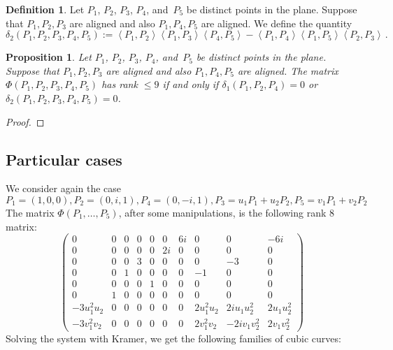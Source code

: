 \documentclass[12pt, a4paper, reqno, captions=tableheading,bibliography=totoc]{scrartcl}
\theoremstyle{plain}
\newtheorem{prop}[lemma]{Proposition}
\theoremstyle{definition}
\newtheorem{definition}[lemma]{Definition}
\newcommand{\imunit}{i}
\newcommand{\scl}[2]{\left\langle {#1}, {#2} \right\rangle}
\begin{document}
\begin{definition}
 Let $P_1$, $P_2$, $P_3$, $P_4$, and~$P_5$ be distinct points in the plane.
 Suppose that $P_1, P_2, P_3$ are aligned and also $P_1, P_4, P_5$ are aligned.
 We define the quantity
 \[
  \delta_2(P_1, P_2, P_3, P_4, P_5) :=
  \scl{P_1}{P_2} \scl{P_1}{P_3} \scl{P_4}{P_5} -
  \scl{P_1}{P_4} \scl{P_1}{P_5} \scl{P_2}{P_3} \,.
 \]
\end{definition}

\begin{prop}
 Let $P_1$, $P_2$, $P_3$, $P_4$, and~$P_5$ be distinct points in the plane.
 Suppose that $P_1, P_2, P_3$ are aligned and also $P_1, P_4, P_5$ are aligned.
 The matrix $\Phi(P_1, P_2, P_3, P_4, P_5)$ has rank $\leq 9$ if and only if $\delta_1(P_1, P_2, P_4) = 0$ or $\delta_2(P_1, P_2, P_3, P_4, P_5) = 0$.
\end{prop}
\begin{proof}

\end{proof}

\subsection{Particular cases}

We consider again the case
\[
P_1 = (1, 0, 0), P_2 = (0, i, 1), P_4 = (0, -i, 1), P_3 = u_1P_1+u_2P_2,
P_5 = v_1P_1+v_2P_2
\]
The matrix $\Phi(P_1, \dotsc, P_5)$,
after some manipulations, is the following rank 8 matrix:
\[
\left(\begin{array}{rrrrrrrrrr}
0 & 0 & 0 & 0 & 0 & 0 & 6 \imunit & 0 & 0 & -6 \imunit \\
0 & 0 & 0 & 0 & 0 & 2 \imunit & 0 & 0 & 0 & 0 \\
0 & 0 & 0 & 3 & 0 & 0 & 0 & 0 & -3 & 0 \\
0 & 0 & 1 & 0 & 0 & 0 & 0 & -1 & 0 & 0 \\
0 & 0 & 0 & 0 & 1 & 0 & 0 & 0 & 0 & 0 \\
0 & 1 & 0 & 0 & 0 & 0 & 0 & 0 & 0 & 0 \\
-3 u_{1}^{2} u_{2} & 0 & 0 & 0 & 0 & 0 & 0 & 2 u_{1}^{2} u_{2} & 2 \imunit u_{1} u_{2}^{2} & 2 u_{1} u_{2}^{2} \\
-3 v_{1}^{2} v_{2} & 0 & 0 & 0 & 0 & 0 & 0 & 2 v_{1}^{2} v_{2} & -2 \imunit v_{1} v_{2}^{2} & 2 v_{1} v_{2}^{2}
\end{array}\right)
\]
Solving the system with Kramer, we get the following families of
cubic curves:
\end{document}
